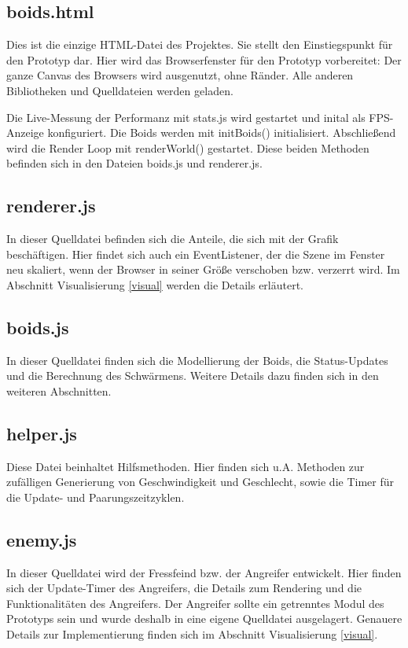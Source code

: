 \documentclass[draft=false
              ,paper=a4
              ,twoside=false
              ,fontsize=11pt
              ,headsepline
              ,BCOR10mm
              ,DIV11
              ,bibtotoc
              ,liststotoc
              ]{scrbook}
\begin{document}
\subsection{boids.html}
Dies ist die einzige HTML-Datei des Projektes. Sie stellt den Einstiegspunkt für den Prototyp dar. Hier wird das Browserfenster für den Prototyp vorbereitet: Der ganze Canvas des Browsers wird ausgenutzt, ohne Ränder. Alle anderen Bibliotheken und Quelldateien werden geladen.

Die Live-Messung der Performanz mit stats.js wird gestartet und inital als FPS-Anzeige konfiguriert.
Die Boids werden mit initBoids() initialisiert. Abschließend wird die Render Loop mit renderWorld() gestartet. Diese beiden Methoden befinden sich in den Dateien boids.js und renderer.js.
\subsection{renderer.js}
In dieser Quelldatei befinden sich die Anteile, die sich mit der Grafik beschäftigen. Hier findet sich auch ein EventListener, der die Szene im Fenster neu skaliert, wenn der Browser in seiner Größe verschoben bzw. verzerrt wird. Im Abschnitt Visualisierung \ref{visual} werden die Details erläutert.
\subsection{boids.js}
In dieser Quelldatei finden sich die Modellierung der Boids, die Status-Updates und die Berechnung des Schwärmens. Weitere Details dazu finden sich in den weiteren Abschnitten.
\subsection{helper.js}
Diese Datei beinhaltet Hilfsmethoden. Hier finden sich u.A. Methoden zur zufälligen Generierung von Geschwindigkeit und Geschlecht, sowie die Timer für die Update- und Paarungszeitzyklen.
\subsection{enemy.js}
In dieser Quelldatei wird der Fressfeind bzw. der Angreifer entwickelt. Hier finden sich der Update-Timer des Angreifers, die Details zum Rendering und die Funktionalitäten des Angreifers. Der Angreifer sollte ein getrenntes Modul des Prototyps sein und wurde deshalb in eine eigene Quelldatei ausgelagert. Genauere Details zur Implementierung finden sich im Abschnitt Visualisierung \ref{visual}.
\end{document}
